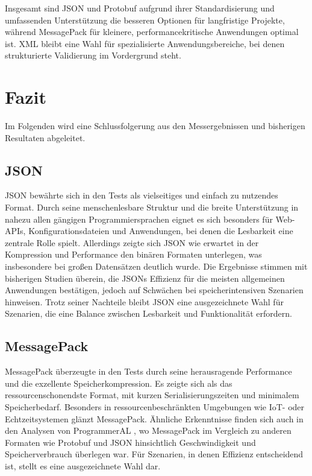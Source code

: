 \documentclass[ngerman]{seminarvorlage}
\begin{document}
\newpage 
Insgesamt sind JSON und Protobuf aufgrund ihrer Standardisierung und umfassenden Unterstützung die besseren Optionen für langfristige Projekte, während MessagePack für kleinere, performancekritische Anwendungen optimal ist. XML bleibt eine Wahl für spezialisierte Anwendungsbereiche, bei denen strukturierte Validierung im Vordergrund steht.


\section{Fazit}

Im Folgenden wird eine Schlussfolgerung aus den Messergebnissen und bisherigen Resultaten abgeleitet.

\subsection{JSON}
JSON bewährte sich in den Tests als vielseitiges und einfach zu nutzendes Format. Durch seine menschenlesbare Struktur und die breite Unterstützung in nahezu allen gängigen Programmiersprachen eignet es sich besonders für Web-APIs, Konfigurationsdateien und Anwendungen, bei denen die Lesbarkeit eine zentrale Rolle spielt. Allerdings zeigte sich JSON wie erwartet in der Kompression und Performance den binären Formaten unterlegen, was insbesondere bei großen Datensätzen deutlich wurde. Die Ergebnisse stimmen mit bisherigen Studien überein, die JSONs Effizienz für die meisten allgemeinen Anwendungen bestätigen, jedoch auf Schwächen bei speicherintensiven Szenarien hinweisen. Trotz seiner Nachteile bleibt JSON eine ausgezeichnete Wahl für Szenarien, die eine Balance zwischen Lesbarkeit und Funktionalität erfordern.


\subsection{MessagePack}
MessagePack überzeugte in den Tests durch seine herausragende Performance und die exzellente Speicherkompression. Es zeigte sich als das ressourcenschonendste Format, mit kurzen Serialisierungszeiten und minimalem Speicherbedarf. Besonders in ressourcenbeschränkten Umgebungen wie IoT- oder Echtzeitsystemen glänzt MessagePack. Ähnliche Erkenntnisse finden sich auch in den Analysen von ProgrammerAL \cite{ProgrammerAL_SerializationBenchmarks}, wo MessagePack im Vergleich zu anderen Formaten wie Protobuf und JSON hinsichtlich Geschwindigkeit und Speicherverbrauch überlegen war. Für Szenarien, in denen Effizienz entscheidend ist, stellt es eine ausgezeichnete Wahl dar.
\end{document}
